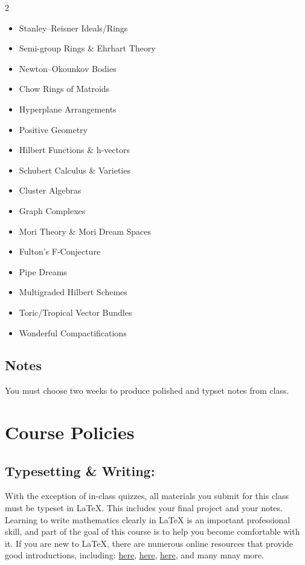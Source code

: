 \documentclass[11pt,letterpaper]{article}
\newcommand{\pageheading}[1]{\section*{#1}\addcontentsline{toc}{section}{#1}}
\begin{document}
\setlength{\columnsep}{24pt}\setlength{\multicolsep}{4pt}
\begin{multicols}{2}
\fontsize{10}{12.5}\selectfont
\begin{itemize}
\item Stanley--Reisner Ideals/Rings
\item Semi-group Rings \& Ehrhart Theory
\item Newton--Okounkov Bodies
\item Chow Rings of Matroids
\item Hyperplane Arrangements
\item Positive Geometry
\item Hilbert Functions \& h-vectors
\item Schubert Calculus \& Varieties
\item Cluster Algebras
\item Graph Complexes
\item Mori Theory \& Mori Dream Spaces
\item Fulton's F-Conjecture
\item Pipe Dreams
\item Multigraded Hilbert Schemes
\item Toric/Tropical Vector Bundles
\item Wonderful Compactifications
\end{itemize}
\end{multicols}

\subsection*{Notes}

You must choose two weeks to produce polished and typset notes from class.

\endgroup
\clearpage
\pageheading{Course Policies}

\subsection*{Typesetting \& Writing:}

With the exception of in-class quizzes, all materials you submit for this class must be typeset in LaTeX. This includes your final project and your notes. Learning to write mathematics clearly in LaTeX is an important professional skill, and part of the goal of this course is to help you become comfortable with it. If you are new to LaTeX, there are numerous online resources that provide good introductions, including: \href{https://www.overleaf.com/learn/latex/Learn\_LaTeX\_in\_30\_minutes}{here}, \href{https://www.overleaf.com/learn/latex/Learn\_LaTeX\_in\_30\_minutes}{here}, \href{https://www.math.cmu.edu/~cnewstea/teaching/old/teaching/21-128-F15/latex-handout.pdf}{here}, and many mnay more.
\end{document}
